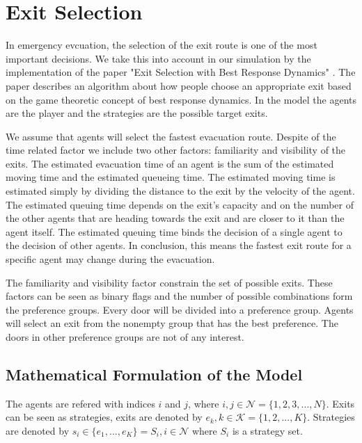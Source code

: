 
\section{Exit Selection}
In emergency evcuation, the selection of the exit route is one of the most
important decisions. We take this into account in our simulation by the
implementation of the paper "Exit Selection with Best Response Dynamics"
\cite{BestResponseDynamics}. The paper describes an algorithm about how people
choose an appropriate exit based on the game theoretic concept of best
response dynamics. In the model the agents are the player and the strategies
are the possible target exits.

We assume that agents will select the fastest evacuation route. Despite of the
time related factor we include two other factors: familiarity and visibility
of the exits. The estimated evacuation time of an agent is the sum of the
estimated moving time and the estimated queueing time. The estimated moving
time is estimated simply by dividing the distance to the exit by the velocity
of the agent. The estimated queuing time depends on the exit's capacity and on
the number of the other agents that are heading towards the exit and are
closer to it than the agent itself. The estimated queuing time binds the
decision of a single agent to the decision of other agents. In conclusion,
this means the fastest exit route for a specific agent may change during the
evacuation.

The familiarity and visibility factor constrain the set of possible exits.
These factors can be seen as binary flags and the number of possible
combinations form the preference groups. Every door will be divided into a
preference group. Agents will select an exit from the nonempty group that has
the best preference. The doors in other preference groups are not of any
interest.

\subsection{Mathematical Formulation of the Model}
The agents are refered with indices $i$ and $j$, where $i,j \in \mathcal{N} =
\{1,2,3,...,N\}$. Exits can be seen as strategies, exits are denoted by $e_k,
k \in \mathcal{K} = \{1,2,...,K\}$. Strategies are denoted by $s_i \in
\{e_1,...,e_K\} = S_i, i \in \mathcal{N}$ where $S_i$ is a strategy set.

